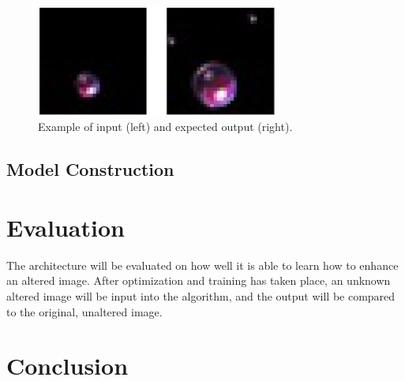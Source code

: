 \documentclass[letterpaper]{article} %
\begin{document}
\begin{figure}[htbp]
\centerline{\includegraphics[width=8cm]{training_pair.png}}
\caption{Example of input (left) and expected output (right).}
\label{fig:training_pair}
\end{figure}

\subsection{Model Construction}
\label{subsec:model}

\section{Evaluation}
\label{sec:methods/evaluation}
The architecture will be evaluated on how well it is able to learn how to
enhance an altered image. After optimization and training has taken place,
an unknown altered image will be input into the algorithm, and the output
will be compared to the original, unaltered image.

\section{Conclusion}
\label{sec:conclusion}

\cite{3D_capsule_networks}
\cite{combining_multiple_cnn}
\cite{conditional_image_generation}
\cite{deep_video_prediction}
\cite{fusionnet}
\cite{generative_adversarial_networks}
\cite{image_to_image}
\cite{show_and_tell}
\cite{pixelcnn++}
\cite{pose_cnn}
\cite{pose_guided_image_generation}
\cite{unsupervised_learning}
\cite{dcgan_git}



\end{document}
